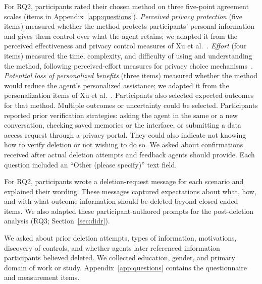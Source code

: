     For RQ2, participants rated their chosen method on three five-point agreement scales (items in Appendix~\ref{app:questions}).
    \textit{Perceived privacy protection} (five items) measured whether the method protects participants' personal information and gives them control over what the agent retains; we adapted it from the perceived effectiveness and privacy control measures of Xu et al.~\cite{xu2011information}.
    \textit{Effort} (four items) measured the time, complexity, and difficulty of using and understanding the method, following perceived-effort measures for privacy choice mechanisms~\cite{habib2022evaluating}.
    \textit{Potential loss of personalized benefits} (three items) measured whether the method would reduce the agent's personalized assistance; we adapted it from the personalization items of Xu et al.~\cite{xu2011personalization}.
    Participants also selected expected outcomes for that method. Multiple outcomes or uncertainty could be selected.
    Participants reported prior verification strategies: asking the agent in the same or a new conversation, checking saved memories or the interface, or submitting a data access request through a privacy portal. 
    They could also indicate not knowing how to verify deletion or not wishing to do so. 
    We asked about confirmations received after actual deletion attempts and feedback agents should provide.
    Each question included an ``Other (please specify)'' text field.

    For RQ2, participants wrote a deletion-request message for each scenario and explained their wording.
    These messages captured expectations about what, how, and with what outcome information should be deleted beyond closed-ended items.
    We also adapted these participant-authored prompts for the post-deletion analysis (RQ3; Section~\ref{sec:didr}).

    We asked about prior deletion attempts, types of information, motivations, discovery of controls, and whether agents later referenced information participants believed deleted.
    We collected education, gender, and primary domain of work or study. 
    Appendix~\ref{app:questions} contains the questionnaire and measurement items.





